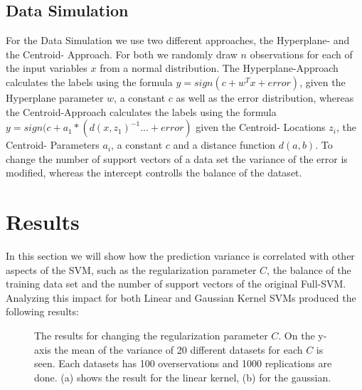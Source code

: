 \documentclass[a4paper]{article}
\begin{document}
\subsection{Data Simulation}
For the Data Simulation we use two different approaches, the Hyperplane- and the Centroid- Approach. For both we randomly draw $n$ observations for each of the input variables $x$ from a normal distribution. The Hyperplane-Approach calculates the labels using the formula $y= sign(c+ w^T x + error)$, given the Hyperplane parameter $w$, a constant $c$ as well as the error distribution, whereas the Centroid-Approach calculates the labels using the formula $y= sign(c + a_1*(d(x,z_1)^{-1}... + error)$ given the Centroid- Locations $z_i$, the Centroid- Parameters  $a_i$, a constant $c$ and a distance function $d(a,b)$.
To change the number of support vectors of a data set the variance of the error is modified, whereas the intercept controlls the balance of the dataset.


\section{Results}

In this section we will show how the prediction variance is correlated with other aspects of the SVM, such as the regularization parameter $C$, the balance of the training data set and the number of support vectors of the original Full-SVM. Analyzing this impact for both Linear  and Gaussian Kernel SVMs produced the following results:

\begin{figure}[!htb]
\begin{center}

\caption{The results for changing the regularization parameter $C$. On the y-axis the mean of the variance of 20 different datasets for each $C$ is seen. Each datasets has 100 overservations and 1000 replications are done. (a) shows the result for the linear kernel, (b) for the gaussian.}
\label{fig3}
\end{center}
\end{figure}
\end{document}
